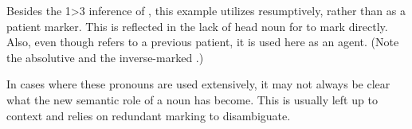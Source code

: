 Besides the 1>3 inference of , this example utilizes  resumptively, rather than as a patient marker. This is reflected in the lack of head noun for  to mark directly. Also, even though  refers to a previous patient, it is used here as an agent. (Note the absolutive  and the inverse-marked .)

In cases where these pronouns are used extensively, it may not always be clear what the new semantic role of a noun has become. This is usually left up to context and relies on redundant marking to disambiguate.